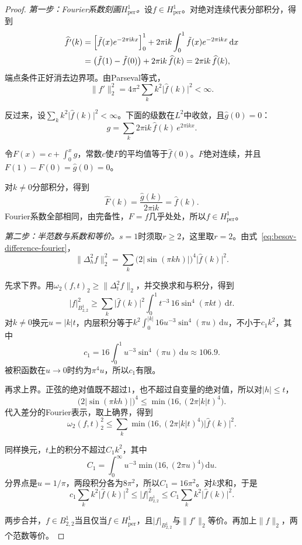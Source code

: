 \begin{proof}
\emph{第一步：Fourier系数刻画$H^1_{\mathrm{per}}$。}设$f\in H^1_{\mathrm{per}}$。对绝对连续代表分部积分，得到
\[
 \begin{aligned}
 \widehat{f'}(k)&=\Bigl[\tilde f(x)e^{-2\pi\mathrm ikx}\Bigr]_0^1+2\pi\mathrm ik\int_0^1\tilde f(x)e^{-2\pi\mathrm ikx}\,\mathrm dx\\
 &=\bigl(\tilde f(1)-\tilde f(0)\bigr)+2\pi\mathrm ik\,\widehat f(k)=2\pi\mathrm ik\,\widehat f(k),
 \end{aligned}
\]
端点条件正好消去边界项。由Parseval等式，
\[
 \lVert f'\rVert_2^2=4\pi^2\sum_kk^2\lvert\widehat f(k)\rvert^2<\infty .
\]

反过来，设$\sum_kk^2\lvert\widehat f(k)\rvert^2<\infty$。下面的级数在$L^2$中收敛，且$\widehat g(0)=0$：
\[
 g=\sum_k2\pi\mathrm ik\,\widehat f(k)\,e^{2\pi\mathrm ikx}.
\]

令$F(x)=c+\int_0^xg$，常数$c$使$F$的平均值等于$\widehat f(0)$。$F$绝对连续，并且$F(1)-F(0)=\widehat g(0)=0$。

对$k\neq0$分部积分，得到
\[
 \widehat F(k)=\frac{\widehat g(k)}{2\pi\mathrm ik}=\widehat f(k).
\]
Fourier系数全部相同，由完备性，$F=f$几乎处处，所以$f\in H^1_{\mathrm{per}}$。

\emph{第二步：半范数与系数和等价。}$s=1$时须取$r\geq2$，这里取$r=2$。由式~\eqref{eq:besov-difference-fourier}，
\[
 \lVert\Delta_h^2f\rVert_2^2=\sum_k\bigl(2\lvert\sin(\pi kh)\rvert\bigr)^4\lvert\widehat f(k)\rvert^2 .
\]

先求下界。用$\omega_2(f,t)_2\geq\lVert\Delta_t^2f\rVert_2$，并交换求和与积分，得到
\[
 \lvert f\rvert_{B^1_{2,2}}^2\geq\sum_k\lvert\widehat f(k)\rvert^2\int_0^1t^{-3}\,16\sin^4(\pi kt)\,\mathrm dt .
\]
对$k\neq0$换元$u=\lvert k\rvert t$，内层积分等于$k^2\int_0^{\lvert k\rvert}16u^{-3}\sin^4(\pi u)\,\mathrm du$，不小于$c_1k^2$，其中
\[
 c_1=16\int_0^1u^{-3}\sin^4(\pi u)\,\mathrm du\approx106.9 .
\]
被积函数在$u\to0$时约为$\pi^4u$，所以$c_1$有限。

再求上界。正弦的绝对值既不超过$1$，也不超过自变量的绝对值，所以对$\lvert h\rvert\leq t$，
\[
 \bigl(2\lvert\sin(\pi kh)\rvert\bigr)^4\leq\min\bigl(16,(2\pi\lvert k\rvert t)^4\bigr).
\]
代入差分的Fourier表示，取上确界，得到
\[
 \omega_2(f,t)_2^2\leq\sum_k\min\bigl(16,(2\pi\lvert k\rvert t)^4\bigr)\lvert\widehat f(k)\rvert^2 .
\]

同样换元，$t$上的积分不超过$C_1k^2$，其中
\[
 C_1=\int_0^\infty u^{-3}\min\bigl(16,(2\pi u)^4\bigr)\,\mathrm du .
\]
分界点是$u=1/\pi$，两段积分各为$8\pi^2$，所以$C_1=16\pi^2$。对$k$求和，于是
\[
 c_1\sum_kk^2\lvert\widehat f(k)\rvert^2\leq\lvert f\rvert_{B^1_{2,2}}^2\leq C_1\sum_kk^2\lvert\widehat f(k)\rvert^2 .
\]

两步合并，$f\in B^1_{2,2}$当且仅当$f\in H^1_{\mathrm{per}}$，且$\lvert f\rvert_{B^1_{2,2}}$与$\lVert f'\rVert_2$等价。再加上$\lVert f\rVert_2$，两个范数等价。
\end{proof}

